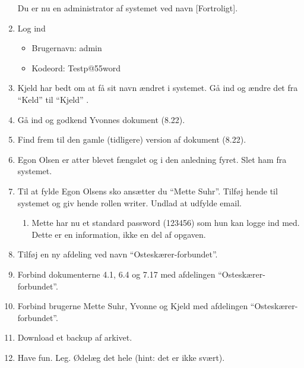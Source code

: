 \begin{enumerate}
Du er nu en administrator af systemet ved navn [Fortroligt].
	\item Log ind
		\begin{itemize}
			\item Brugernavn: admin
			\item Kodeord: Testp@55word
		\end{itemize}
	\item Kjeld har bedt om at få sit navn ændret i systemet. Gå ind og ændre det fra “Keld” til “Kjeld” . 
	\item Gå ind og godkend Yvonnes dokument (8.22).
	\item Find frem til den gamle (tidligere) version af dokument (8.22).
	\item Egon Olsen er atter blevet fængslet og i den anledning fyret. Slet ham fra systemet.
	\item Til at fylde Egon Olsens sko ansætter du “Mette Suhr”. 	Tilføj hende til systemet og giv hende rollen writer. 
Undlad at udfylde email.
		\begin{enumerate}
			\item Mette har nu et standard password (123456) som hun kan logge ind med. Dette er en information, ikke en del af opgaven.
		\end{enumerate}
	\item Tilføj en ny afdeling ved navn “Osteskærer-forbundet”.
	\item Forbind dokumenterne 4.1, 6.4 og 7.17 med afdelingen “Osteskærer-forbundet”.
	\item Forbind brugerne Mette Suhr, Yvonne og Kjeld med afdelingen “Osteskærer-forbundet”.
	\item Download et backup af arkivet.
	\item Have fun. Leg. Ødelæg det hele (hint: det er ikke svært).
\end{enumerate}
